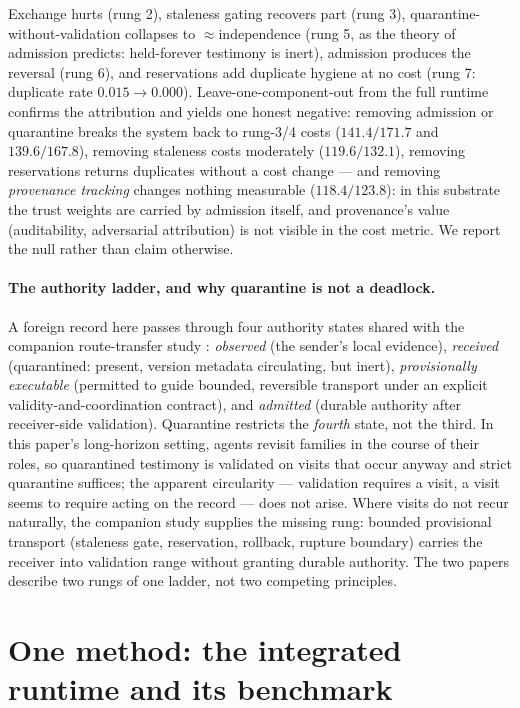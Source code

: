 \documentclass{article}
\begin{document}
Exchange hurts (rung 2), staleness gating recovers part (rung 3),
quarantine-without-validation collapses to $\approx$independence
(rung 5, as the theory of admission predicts: held-forever testimony
is inert), admission produces the reversal (rung 6), and reservations
add duplicate hygiene at no cost (rung 7: duplicate rate
$0.015 \to 0.000$). Leave-one-component-out from the full runtime
confirms the attribution and yields one honest negative: removing
admission or quarantine breaks the system back to rung-3/4 costs
($141.4/171.7$ and $139.6/167.8$), removing staleness costs
moderately ($119.6/132.1$), removing reservations returns duplicates
without a cost change --- and removing \emph{provenance tracking}
changes nothing measurable ($118.4/123.8$): in this substrate the
trust weights are carried by admission itself, and provenance's value
(auditability, adversarial attribution) is not visible in the cost
metric. We report the null rather than claim otherwise.

\paragraph{The authority ladder, and why quarantine is not a
deadlock.} A foreign record here passes through four authority states
shared with the companion route-transfer study \citep{songlines2}:
\emph{observed} (the sender's local evidence), \emph{received}
(quarantined: present, version metadata circulating, but inert),
\emph{provisionally executable} (permitted to guide bounded,
reversible transport under an explicit validity-and-coordination
contract), and \emph{admitted} (durable authority after receiver-side
validation). Quarantine restricts the \emph{fourth} state, not the
third. In this paper's long-horizon setting, agents revisit families
in the course of their roles, so quarantined testimony is validated on
visits that occur anyway and strict quarantine suffices; the apparent
circularity --- validation requires a visit, a visit seems to require
acting on the record --- does not arise. Where visits do not recur
naturally, the companion study supplies the missing rung: bounded
provisional transport (staleness gate, reservation, rollback, rupture
boundary) carries the receiver into validation range without granting
durable authority. The two papers describe two rungs of one ladder,
not two competing principles.


\section{One method: the integrated runtime and its benchmark}
\label{p5:sec:integration}
\end{document}
